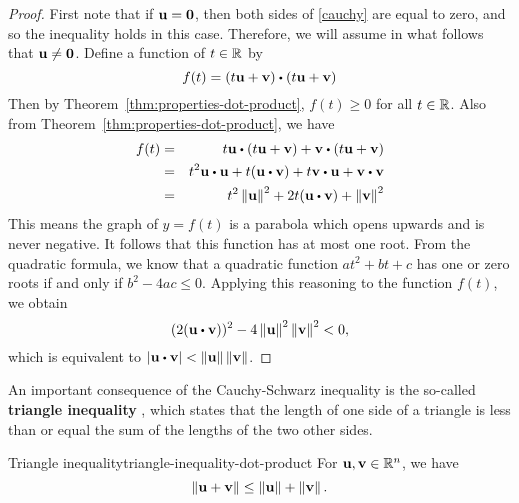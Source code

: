 \begin{proof}
  First note that if $\mbox{\bf u}=\mbox{\bf 0}$, then both sides of
  \eqref{cauchy} are equal to zero, and so the inequality holds in
  this case. Therefore, we will assume in what follows that
  $\mbox{\bf u}\neq \mbox{\bf 0}$.  Define a function of $t\in \mathbb{R}$ by
  \begin{equation*}
    f(t) =(t\vect{u}+\vect{v}) \dotprod (t\vect{u}+
      \vect{v}) 
  \end{equation*}
  Then by Theorem~\ref{thm:properties-dot-product}, $f(t) \geq 0$
  for all $t\in \mathbb{R}$.  Also from
  Theorem~\ref{thm:properties-dot-product}, we have
  \begin{eqnarray*}
    f(t) &=&t\vect{u}\dotprod (t\vect{u}+\vect{v}) +
                 \vect{v}\dotprod (t\vect{u}+\vect{v}) \\
             &=&t^2\vect{u}\dotprod \vect{u}+t(\vect{u}\dotprod \vect{v}) + t \vect{v}\dotprod \vect{u}+
                 \vect{v}\dotprod \vect{v} \\
             &=&t^2\norm{\vect{u}}^{2}+2t(\vect{u}\dotprod \vect{v}) +\norm{
                 \vect{v}} ^{2}
  \end{eqnarray*}
  This means the graph of $y=f(t)$ is a parabola which opens upwards
  and is never negative. It follows that this function has at most one
  root. From the quadratic formula, we know that a quadratic function
  $at^2+bt+c$ has one or zero roots if and only if $b^2-4ac\leq
  0$. Applying this reasoning to the function $f(t)$, we obtain
  \begin{equation*}
    (2(\vect{u}\dotprod \vect{v})) ^{2}-4\norm{\vect{u}
    } ^{2}\norm{\vect{v}} ^{2}<0,
  \end{equation*}
  which is equivalent to
  $\abs{\vect{u}\dotprod \vect{v} }<\norm{\vect{u}} \norm{\vect{v}}$.
\end{proof}

An important consequence of the Cauchy-Schwarz inequality is the
so-called \textbf{triangle inequality}%
, which states that the length
of one side of a triangle is less than or equal the sum of the lengths
of the two other sides.

\begin{theorem}{Triangle inequality}{triangle-inequality-dot-product}
  For\/ $\mbox{\bf u},\mbox{\bf v}\in \mathbb{R}^{n}$, we have
  \begin{equation}\label{triangle-ineq-1}
    \left\|\mbox{\bf u}+\mbox{\bf v}\right\| \leq \left\|\mbox{\bf u}\right\| +\left\|\mbox{\bf v}\right\|.
  \end{equation}

  \begin{center}
  \end{center}
\end{theorem}

